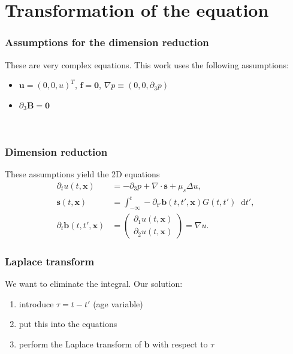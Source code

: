\documentclass[12pt,a4paper,handout]{beamer}
\theoremstyle{definition}
\theoremstyle{plain}
\newcommand{\bfu}{\bm{u}}
\newcommand{\bff}{\bm{f}}
\newcommand{\bfB}{\bm{B}}
\newcommand{\bfb}{\bm{b}}
\newcommand{\bfs}{\bm{s}}
\newcommand{\bfx}{\bm{x}}
\newcommand{\D}{\mathop{}\!\mathrm{d}}
\begin{document}
\section{Transformation of the equation}
    \begin{frame}
        \frametitle{Assumptions for the dimension reduction}
        These are very complex equations. This work uses the following assumptions:
        \begin{itemize}[<+->]
            \item $\bfu= (0,0,u)^T$, $\bff=\bm{0}$, $\nabla p\equiv(0,0,\partial_3 p)$
            \item $\partial_3\bfB =\bm{0}$
         \end{itemize}
    \\
    
    \end{frame}
\begin{frame}
    \frametitle{Dimension reduction}
    These assumptions yield the 2D equations 
    \begin{align*}
    \partial_t u(t,\bfx) &= -\partial_3 p +\nabla\cdot \bfs+\mu_s\Delta u,\\
    \bfs(t,\bfx) &=\int_{-\infty}^t-\partial_{t'}\bfb(t,t',\bfx)G(t,t')\D t',\label{eq:s2D}\\
    \partial_t\bfb(t,t',\bfx)&=
    \begin{pmatrix}
    \partial_1 u(t,\bfx)\\\partial_2 u(t,\bfx)
    \end{pmatrix}=\nabla u.
    \end{align*}
\end{frame}
\begin{frame}
    \frametitle{Laplace transform}
    We want to eliminate the integral. Our solution: 
    \begin{enumerate}[<+->]
        \item introduce $\tau= t-t'$ (age variable)
        \item put this into the equations
        \item perform the Laplace transform of $\bfb$ with respect to $\tau$
    \end{enumerate}
\end{frame}
\end{document}
